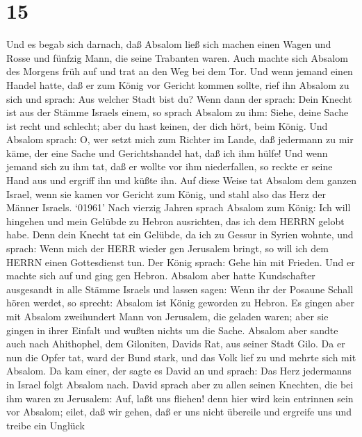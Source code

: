 \hypertarget{section-14}{%
\section{15}\label{section-14}}

 Und es begab sich darnach, daß Absalom ließ sich machen
einen Wagen und Rosse und fünfzig Mann, die seine Trabanten waren.
 Auch machte sich Absalom des Morgens früh auf und trat an
den Weg bei dem Tor. Und wenn jemand einen Handel hatte, daß er zum
König vor Gericht kommen sollte, rief ihn Absalom zu sich und sprach:
Aus welcher Stadt bist du? Wenn dann der sprach: Dein Knecht ist aus der
Stämme Israels einem,  so sprach Absalom zu ihm: Siehe,
deine Sache ist recht und schlecht; aber du hast keinen, der dich hört,
beim König.  Und Absalom sprach: O, wer setzt mich zum
Richter im Lande, daß jedermann zu mir käme, der eine Sache und
Gerichtshandel hat, daß ich ihm hülfe!  Und wenn jemand sich
zu ihm tat, daß er wollte vor ihm niederfallen, so reckte er seine Hand
aus und ergriff ihn und küßte ihn.  Auf diese Weise tat
Absalom dem ganzen Israel, wenn sie kamen vor Gericht zum König, und
stahl also das Herz der Männer Israels.  `01961' Nach
vierzig Jahren sprach Absalom zum König: Ich will hingehen und mein
Gelübde zu Hebron ausrichten, das ich dem HERRN gelobt habe.
 Denn dein Knecht tat ein Gelübde, da ich zu Gessur in
Syrien wohnte, und sprach: Wenn mich der HERR wieder gen Jerusalem
bringt, so will ich dem HERRN einen Gottesdienst tun.  Der
König sprach: Gehe hin mit Frieden. Und er machte sich auf und ging gen
Hebron.  Absalom aber hatte Kundschafter ausgesandt in alle
Stämme Israels und lassen sagen: Wenn ihr der Posaune Schall hören
werdet, so sprecht: Absalom ist König geworden zu Hebron. 
Es gingen aber mit Absalom zweihundert Mann von Jerusalem, die geladen
waren; aber sie gingen in ihrer Einfalt und wußten nichts um die Sache.
 Absalom aber sandte auch nach Ahithophel, dem Giloniten,
Davids Rat, aus seiner Stadt Gilo. Da er nun die Opfer tat, ward der
Bund stark, und das Volk lief zu und mehrte sich mit Absalom.
 Da kam einer, der sagte es David an und sprach: Das Herz
jedermanns in Israel folgt Absalom nach.  David sprach aber
zu allen seinen Knechten, die bei ihm waren zu Jerusalem: Auf, laßt uns
fliehen! denn hier wird kein entrinnen sein vor Absalom; eilet, daß wir
gehen, daß er uns nicht übereile und ergreife uns und treibe ein Unglück

